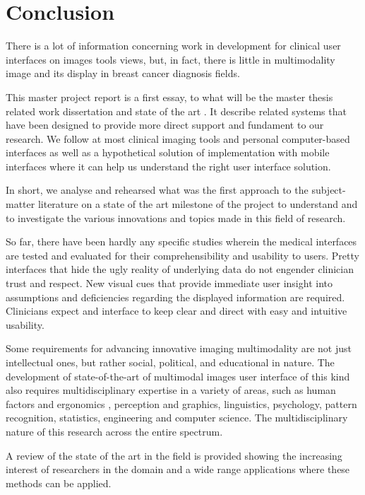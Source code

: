 
\chapter{Conclusion}
\label{chapter:conclusion}

There is a lot of information concerning work in development for clinical user interfaces on images tools views, but, in fact, there is little in multimodality image and its display in breast cancer diagnosis fields.

This master project report is a first essay, to what will be the master thesis related work dissertation and state of the art \cite{borchers2012persuasion}. It describe related systems that have been designed to provide more direct support and fundament to our research. We follow at most clinical imaging tools and personal computer-based interfaces as well as a hypothetical solution of implementation with mobile interfaces where it can help us understand the right user interface solution.

In short, we analyse and rehearsed what was the first approach to the subject-matter literature on a state of the art milestone of the project to understand and to investigate the various innovations and topics made in this field of research.

So far, there have been hardly any specific studies wherein the medical interfaces are tested and evaluated for their comprehensibility and usability to users. Pretty interfaces that hide the ugly reality of underlying data do not engender clinician trust and respect. New visual cues that provide immediate user insight into assumptions and deficiencies regarding the displayed information are required. Clinicians expect and interface to keep clear and direct with easy and intuitive usability.

Some requirements for advancing innovative imaging multimodality are not just intellectual ones, but rather social, political, and educational in nature. The development of state-of-the-art of multimodal images user interface of this kind also requires multidisciplinary expertise in a variety of areas, such as human factors and ergonomics \cite{wikipedia2016humanfactors}, perception and graphics, linguistics, psychology, pattern recognition, statistics, engineering and computer science. The multidisciplinary nature of this research across the entire spectrum.

A review of the state of the art in the field is provided showing the increasing interest of researchers in the domain and a wide range applications where these methods can be applied.

